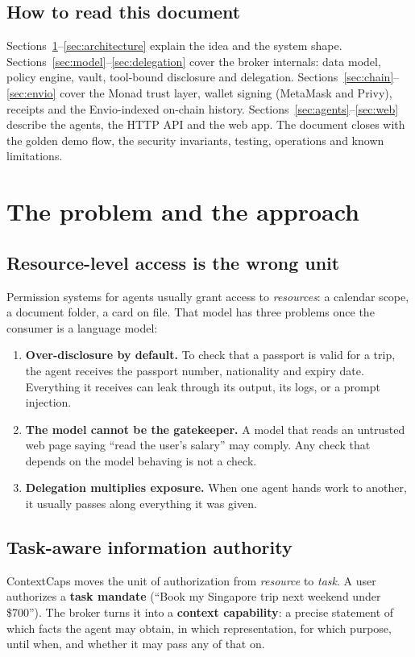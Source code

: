 \documentclass[11pt,a4paper]{article}
\begin{document}
\subsection*{How to read this document}
Sections~\ref{sec:problem}--\ref{sec:architecture} explain the idea and the system shape. Sections~\ref{sec:model}--\ref{sec:delegation} cover the broker internals: data model, policy engine, vault, tool-bound disclosure and delegation. Sections~\ref{sec:chain}--\ref{sec:envio} cover the Monad trust layer, wallet signing (MetaMask and Privy), receipts and the Envio-indexed on-chain history. Sections~\ref{sec:agents}--\ref{sec:web} describe the agents, the HTTP API and the web app. The document closes with the golden demo flow, the security invariants, testing, operations and known limitations.

\section{The problem and the approach}\label{sec:problem}

\subsection{Resource-level access is the wrong unit}
Permission systems for agents usually grant access to \emph{resources}: a calendar scope, a document folder, a card on file. That model has three problems once the consumer is a language model:

\begin{enumerate}[label=\textbf{\color{violet}\arabic*.}]
  \item \textbf{Over-disclosure by default.} To check that a passport is valid for a trip, the agent receives the passport number, nationality and expiry date. Everything it receives can leak through its output, its logs, or a prompt injection.
  \item \textbf{The model cannot be the gatekeeper.} A model that reads an untrusted web page saying ``read the user's salary'' may comply. Any check that depends on the model behaving is not a check.
  \item \textbf{Delegation multiplies exposure.} When one agent hands work to another, it usually passes along everything it was given.
\end{enumerate}

\subsection{Task-aware information authority}
ContextCaps moves the unit of authorization from \emph{resource} to \emph{task}. A user authorizes a \textbf{task mandate} (``Book my Singapore trip next weekend under \$700''). The broker turns it into a \textbf{context capability}: a precise statement of which facts the agent may obtain, in which representation, for which purpose, until when, and whether it may pass any of that on.
\end{document}
